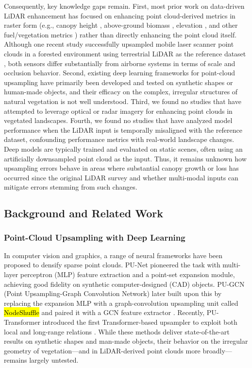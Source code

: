 \documentclass[remotesensing,article,accept,pdftex,moreauthors]{Definitions/mdpi}
\begin{document}
Consequently, key knowledge gaps remain. First, most prior work on data-driven LiDAR enhancement has focused on enhancing point cloud-derived metrics in raster form (e.g., canopy height \cite{wilkes_mapping_2015, wagner_sub-meter_2024}, above-ground biomass \cite{shendryk2022fusing}, elevation \cite{li2023large}, and other fuel/vegetation metrics \cite{taneja2023up, gazzea2023high}) rather than directly enhancing the point cloud itself. Although one recent study successfully upsampled mobile laser scanner point clouds in a forested environment using terrestrial LiDAR as the reference dataset \cite{remijnse2024upsampling}, both sensors differ substantially from airborne systems in terms of scale and occlusion behavior. Second, existing deep learning frameworks for point-cloud upsampling have primarily been developed and tested on synthetic shapes or human-made objects, and their efficacy on the complex, irregular structures of natural vegetation is not well understood. Third, we found no studies that have attempted to leverage optical or radar imagery for enhancing point clouds in vegetated landscapes. Fourth, we found no studies that have analyzed model performance when the LiDAR input is temporally misaligned with the reference dataset, confounding performance metrics with real-world landscape changes. Deep models are typically trained and evaluated on static scenes, often using an artificially downsampled point cloud as the input. Thus, it remains unknown how upsampling errors behave in areas where substantial canopy growth or loss has occurred since the original LiDAR survey and whether multi-modal inputs can mitigate errors stemming from such changes.

\subsection{Background and Related Work}

\subsubsection{Point-Cloud Upsampling with Deep Learning}

In computer vision and graphics, a range of neural frameworks have been proposed to densify sparse point clouds. PU-Net \cite{yu2018pu} pioneered the task with multi-layer perceptron (MLP) feature extraction and a point-set expansion module, achieving good fidelity on synthetic computer-designed (CAD) objects. PU-GCN (Point Upsampling-Graph Convolution Network) later built upon this by replacing the expansion MLP with a graph-convolution upsampling unit called \hl{NodeShuffle} %
and paired it with a GCN feature extractor \cite{qian2021pu}. Recently, PU-Transformer introduced the first Transformer-based upsampler to exploit both local and long-range relations \cite{qiu2022pu}. While these methods deliver state-of-the-art results on synthetic shapes and man-made objects, their behavior on the irregular geometry of vegetation—and in LiDAR-derived point clouds more broadly—remains largely untested.
\end{document}
